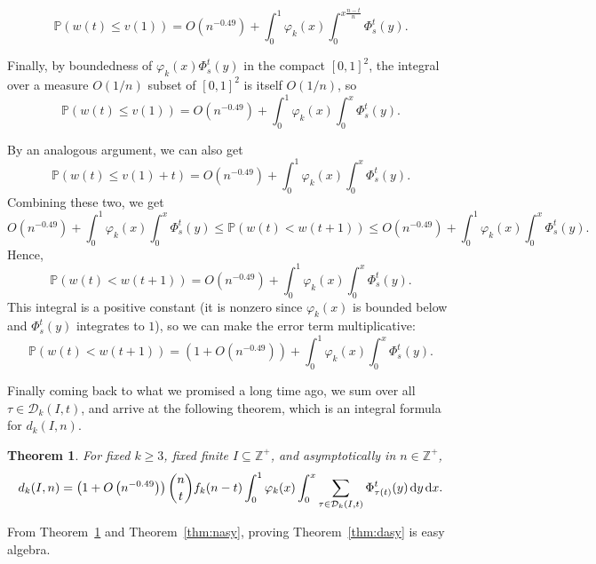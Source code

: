 \documentclass{amsart}
\newtheorem{theorem}{Theorem}[section]
\theoremstyle{definition}
\begin{document}
\[\mathbb{P}\left(w(t)\leq v(1)\right)=O(n^{-0.49})+\int_0^1\varphi_k(x)\int_{0}^{x\frac{n-t}{n}} \Phi_s^t(y).\]

Finally, by boundedness of $\varphi_k(x)\Phi_s^t(y)$ in the compact $[0,1]^2$, the integral over a measure $O(1/n)$ subset of $[0,1]^2$ is itself $O(1/n)$, so
\[\mathbb{P}\left(w(t)\leq v(1)\right)=O(n^{-0.49})+\int_0^1\varphi_k(x)\int_{0}^{x}\Phi_s^t(y).\]

By an analogous argument, we can also get
\[\mathbb{P}(w(t)\leq v(1)+t)=O(n^{-0.49})+\int_0^1\varphi_k(x)\int_{0}^{x}\Phi_s^t(y).\]
Combining these two, we get
\[O(n^{-0.49})+\int_0^1\varphi_k(x)\int_{0}^{x}\Phi_s^t(y)\leq \mathbb{P}(w(t)<w(t+1))\leq O(n^{-0.49})+\int_0^1\varphi_k(x)\int_{0}^{x}\Phi_s^t(y).\]
Hence,
\[\mathbb{P}(w(t)<w(t+1))=O(n^{-0.49})+\int_0^1\varphi_k(x)\int_{0}^{x}\Phi_s^t(y).\]
This integral is a positive constant (it is nonzero since $\varphi_k(x)$ is bounded below and $\Phi^t_s(y)$ integrates to $1$), so we can make the error term multiplicative:
\[\mathbb{P}(w(t)<w(t+1))=\left(1+O(n^{-0.49})\right)+\int_0^1\varphi_k(x)\int_{0}^{x}\Phi_s^t(y).\]


Finally coming back to what we promised a long time ago, we sum over all $\tau\in \mathcal{D}_k(I,t)$, and arrive at the following theorem, which is an integral formula for $d_k(I,n)$.

\begin{theorem}\label{thm:precdasy}
For fixed $k\geq 3$, fixed finite $I\subseteq \mathbb{Z}^+$, and asymptotically in $n\in \mathbb{Z}^+$,
\[d_k(I,n)=\left(1+O\left(n^{-0.49}\right)\right)\binom{n}{t}f_k(n-t)\int_0^1\varphi_k(x)\int_{0}^{x}\sum_{\tau\in \mathcal{D}_k(I,t)}\Phi_{\tau(t)}^t(y)\hspace{0.5mm}\mathrm{d}y\hspace{0.5mm}\mathrm{d}x.\]
\end{theorem}

From Theorem~\ref{thm:precdasy} and Theorem~\ref{thm:nasy}, proving Theorem~\ref{thm:dasy} is easy algebra.
\end{document}
